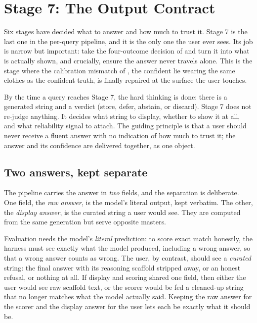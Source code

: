 \chapter{Stage 7: The Output Contract}
\label{ch:output}

Six stages have decided what to answer and how much to trust it. Stage 7 is the last
one in the per-query pipeline, and it is the only one the user ever sees. Its job is
narrow but important: take the four-outcome decision of  and turn
it into what is actually shown, and crucially, ensure the answer never travels alone.
This is the stage where the calibration mismatch of , the confident
lie wearing the same clothes as the confident truth, is finally repaired at the
surface the user touches.

\begin{intuition}
By the time a query reaches Stage 7, the hard thinking is done: there is a generated
string and a verdict (store, defer, abstain, or discard). Stage 7 does not re-judge
anything. It decides what string to display, whether to show it at all, and what
reliability signal to attach. The guiding principle is that a user should never
receive a fluent answer with no indication of how much to trust it; the answer and
its confidence are delivered together, as one object.
\end{intuition}

\section{Two answers, kept separate}
\label{sec:output-two-answers}

The pipeline carries the answer in \emph{two} fields, and the separation is
deliberate. One field, the \emph{raw answer}, is the model's literal output, kept
verbatim. The other, the \emph{display answer}, is the curated string a user would
see. They are computed from the same generation but serve opposite masters.

\begin{intuition}
Evaluation needs the model's \emph{literal} prediction: to score exact match
honestly, the harness must see exactly what the model produced, including a wrong
answer, so that a wrong answer counts as wrong. The user, by contrast, should see a
\emph{curated} string: the final answer with its reasoning scaffold stripped away, or
an honest refusal, or nothing at all. If display and scoring shared one field, then
either the user would see raw scaffold text, or the scorer would be fed a cleaned-up
string that no longer matches what the model actually said. Keeping the raw answer for
the scorer and the display answer for the user lets each be exactly what it should be.
\end{intuition}

